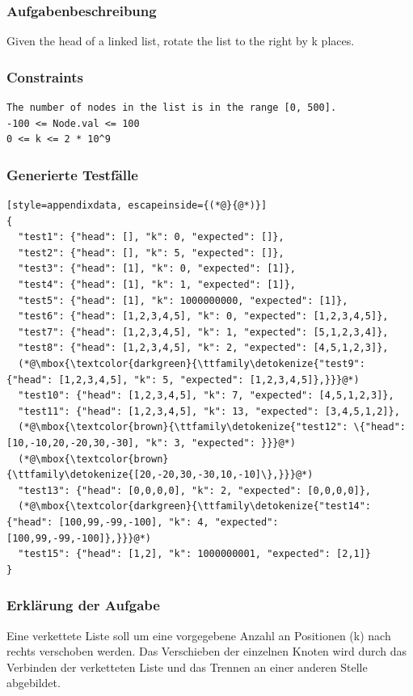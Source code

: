 \subsubsection*{Aufgabenbeschreibung}
Given the head of a linked list, rotate the list to the right by k places.

\subsubsection*{Constraints}
\begin{lstlisting}[style=appendixdata]
The number of nodes in the list is in the range [0, 500].
-100 <= Node.val <= 100
0 <= k <= 2 * 10^9
\end{lstlisting}

\subsubsection*{Generierte Testfälle}
\begin{lstlisting}[style=appendixdata, escapeinside={(*@}{@*)}]
{
  "test1": {"head": [], "k": 0, "expected": []},
  "test2": {"head": [], "k": 5, "expected": []},
  "test3": {"head": [1], "k": 0, "expected": [1]},
  "test4": {"head": [1], "k": 1, "expected": [1]},
  "test5": {"head": [1], "k": 1000000000, "expected": [1]},
  "test6": {"head": [1,2,3,4,5], "k": 0, "expected": [1,2,3,4,5]},
  "test7": {"head": [1,2,3,4,5], "k": 1, "expected": [5,1,2,3,4]},
  "test8": {"head": [1,2,3,4,5], "k": 2, "expected": [4,5,1,2,3]},
  (*@\mbox{\textcolor{darkgreen}{\ttfamily\detokenize{"test9": {"head": [1,2,3,4,5], "k": 5, "expected": [1,2,3,4,5]},}}}@*)
  "test10": {"head": [1,2,3,4,5], "k": 7, "expected": [4,5,1,2,3]},
  "test11": {"head": [1,2,3,4,5], "k": 13, "expected": [3,4,5,1,2]},
  (*@\mbox{\textcolor{brown}{\ttfamily\detokenize{"test12": \{"head": [10,-10,20,-20,30,-30], "k": 3, "expected": }}}@*)
  (*@\mbox{\textcolor{brown}{\ttfamily\detokenize{[20,-20,30,-30,10,-10]\},}}}@*)
  "test13": {"head": [0,0,0,0], "k": 2, "expected": [0,0,0,0]},
  (*@\mbox{\textcolor{darkgreen}{\ttfamily\detokenize{"test14": {"head": [100,99,-99,-100], "k": 4, "expected": [100,99,-99,-100]},}}}@*)
  "test15": {"head": [1,2], "k": 1000000001, "expected": [2,1]}
}
\end{lstlisting}

\subsubsection*{Erklärung der Aufgabe}
Eine verkettete Liste soll um eine vorgegebene Anzahl an Positionen (k) nach rechts verschoben werden. Das Verschieben der einzelnen 
Knoten wird durch das Verbinden der verketteten Liste und das Trennen an einer anderen Stelle abgebildet.

